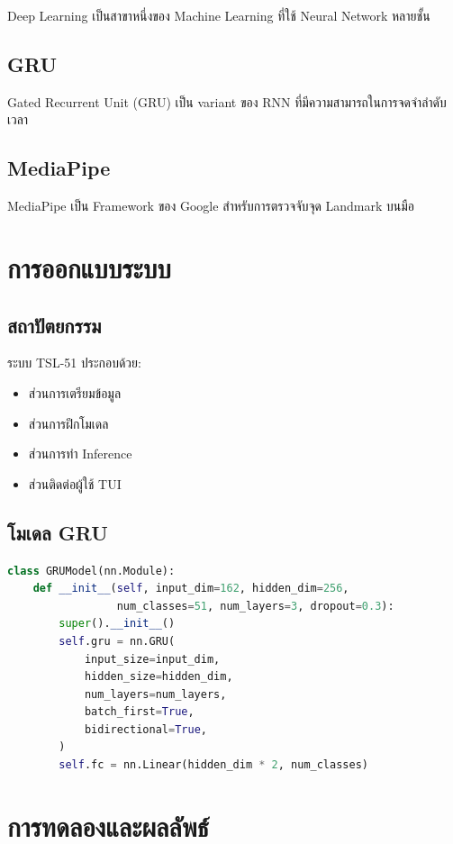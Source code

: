\documentclass[12pt,a4paper]{report}
\begin{document}
Deep Learning เป็นสาขาหนึ่งของ Machine Learning ที่ใช้ Neural Network หลายชั้น

\section{GRU}

Gated Recurrent Unit (GRU) เป็น variant ของ RNN ที่มีความสามารถในการจดจำลำดับเวลา

\section{MediaPipe}

MediaPipe เป็น Framework ของ Google สำหรับการตรวจจับจุด Landmark บนมือ

\chapter{การออกแบบระบบ}

\section{สถาปัตยกรรม}

ระบบ TSL-51 ประกอบด้วย:
\begin{itemize}
    \item ส่วนการเตรียมข้อมูล
    \item ส่วนการฝึกโมเดล
    \item ส่วนการทำ Inference
    \item ส่วนติดต่อผู้ใช้ TUI
\end{itemize}

\section{โมเดล GRU}

\begin{lstlisting}[language=Python]
class GRUModel(nn.Module):
    def __init__(self, input_dim=162, hidden_dim=256, 
                 num_classes=51, num_layers=3, dropout=0.3):
        super().__init__()
        self.gru = nn.GRU(
            input_size=input_dim,
            hidden_size=hidden_dim,
            num_layers=num_layers,
            batch_first=True,
            bidirectional=True,
        )
        self.fc = nn.Linear(hidden_dim * 2, num_classes)
\end{lstlisting}

\chapter{การทดลองและผลลัพธ์}
\end{document}
